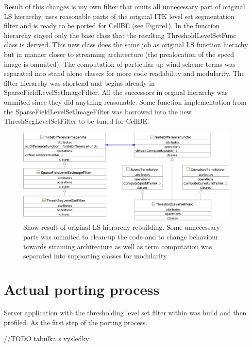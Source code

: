 Result of this changes is my own filter that omits all unnecessary part of original LS hierarchy, uses reasonable parts of the original ITK level set segmentation filter and is ready to be ported for CellBE (see Figure\ref{fg:resultingFilter}). In the function hierarchy stayed only the base class that the resulting ThresholdLevelSetFunc class is derived. This new class does the same job as original LS function hierachy but in manner closer to streaming architecture (the prealocation of the speed image is ommited). The computation of particular up-wind scheme terms was separated into stand alone classes for more code readability and modularity. The filter hierarchy was shortend and begins already in SparseFieldLevelSetImageFilter. All the successors in orginal hierarchy was ommited since they did anything reasonable. Some function implementation from the SparseFieldLevelSetImageFilter was borrowed into the new ThreshSegLevelSetFilter to be tuned for CellBE.

\begin{figure}
    \centering
    \includegraphics[width=15cm]{data/resultingFilter.eps}
    \caption[Resulting level set filter ready to be ported to CellBE]{Show result of original LS hierarchy rebuilding. Some unnecessary parts was ommited to clean-up the code and to change behaviour towards straming architecture as well as term computation was separated into supporting classes for modularity}
    \label{fg:resultingFilter}
\end{figure}

\section{Actual porting process}

Server application with the thresholding level set filter within was build and then profiled. As the first step of the porting process.

//TODO tabulka s vysledky

